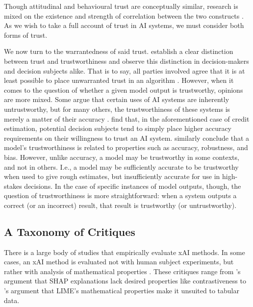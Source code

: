 Though attitudinal and behavioural trust are conceptually similar, research is mixed on the existence and strength of correlation between the two constructs \cite{ahmed_relationship_2009, kim_relation_2018}. As we wish to take a full account of trust in AI systems, we must consider both forms of trust.

We now turn to the warrantedness of said trust. \textcite{Vereschak_Alizadeh_Bailly_Caramiaux_2024} establish a clear distinction between trust and trustworthiness and observe this distinction in decision-makers and decision subjects alike. That is to say, all parties involved agree that it is at least possible to place unwarranted trust in an algorithm \cite{Vereschak_Alizadeh_Bailly_Caramiaux_2024}. However, when it comes to the question of whether a given model output is trustworthy, opinions are more mixed. Some argue that certain uses of AI systems are inherently untrustworthy, but for many others, the trustworthiness of these systems is merely a matter of their accuracy \cite{Rebitschek_Gigerenzer_Wagner_2021}. \textcite{Rebitschek_Gigerenzer_Wagner_2021} find that, in the aforementioned case of credit estimation, potential decision subjects tend to simply place higher accuracy requirements on their willingness to trust an AI system. \textcite{jacovi_formalizing_2021} similarly conclude that a model's trustworthiness is related to properties such as accuracy, robustness, and bias. However, unlike accuracy, a model may be trustworthy in some contexts, and not in others. I.e., a model may be sufficiently accurate to be trustworthy when used to give rough estimates, but insufficiently accurate for use in high-stakes decisions. In the case of specific instances of model outputs, though, the question of trustworthiness is more straightforward: when a system outputs a correct (or an incorrect) result, that result is trustworthy (or untrustworthy).

\subsection{A Taxonomy of Critiques}
There is a large body of studies that empirically evaluate xAI methods. In some cases, an xAI method is evaluated not with human subject experiments, but rather with analysis of mathematical properties \cite{doshi-velez_towards_2017}. These critiques range from \textcite{kumar_problems_2020}'s argument that SHAP explanations lack desired properties like contrastiveness to \textcite{lundberg_unified_2017}'s argument that LIME's mathematical properties make it unsuited to tabular data.

